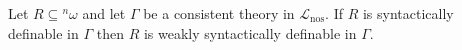 Let $R \subseteq {}^n\omega$ and let $\Gamma$ be a consistent theory in $\mathcal{L}_{\text{nos}}$. If $R$ is syntactically definable in $\Gamma$ then $R$ is weakly syntactically definable in $\Gamma$.
